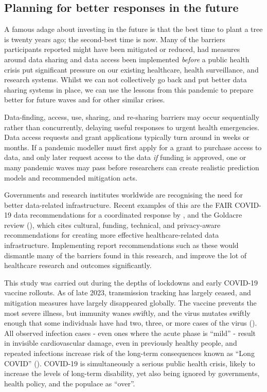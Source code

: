 \documentclass{CUP-JNL-DAP}%
\begin{document}
\subsection{Planning for better responses in the future}
A famous adage about investing in the future is that the best time to plant a tree is twenty years ago; the second-best time is now. Many of the barriers participants reported might have been mitigated or reduced, had measures around data sharing and data access been implemented \textit{before} a public health crisis put significant pressure on our existing healthcare, health surveillance, and research systems. Whilst we can not collectively go back and put better data sharing systems in place, we can use the lessons from this pandemic to prepare better for future waves and for other similar crises. 

Data-finding, access, use, sharing, and re-sharing barriers may occur sequentially rather than concurrently, delaying useful responses to urgent health emergencies. Data access requests and grant applications typically turn around in weeks or months. If a pandemic modeller must first apply for a grant to purchase access to data, and only later request access to the data \textit{if} funding is approved, one or many pandemic waves may pass before researchers can create realistic prediction models and recommended mitigation acts. 

Governments and research institutes worldwide are recognising the need for better data-related infrastructure. Recent examples of this are the FAIR COVID-19 data recommendations for a coordinated response by \cite{FAIR_data_for_a_coordinated_COVID-19_response},  and the Goldacre review (\cite{goldacre_review}), which cites cultural, funding, technical, and privacy-aware recommendations for creating more effective healthcare-related data infrastructure. Implementing report recommendations such as these would dismantle many of the barriers found in this research, and improve the lot of healthcare research and outcomes significantly.

This study was carried out during the depths of lockdowns and early COVID-19 vaccine rollouts. As of late 2023, transmission tracking has largely ceased, and mitigation measures have largely disappeared globally. The vaccine prevents the most severe illness, but immunity wanes swiftly, and the virus mutates swiftly enough that some individuals have had two, three, or more cases of the virus (\cite{collaboratory_burden_2022}). All observed infection cases - even ones where the acute phase is “mild” - result in invisible cardiovascular damage, even in previously healthy people, and repeated infections increase risk of the long-term consequences known as “Long COVID” (\cite{davis_et_al}). COVID-19 is simultaneously a serious public health crisis, likely to increase the levels of long-term disability, yet also being ignored by governments, health policy, and the populace as “over”. 
\end{document}
